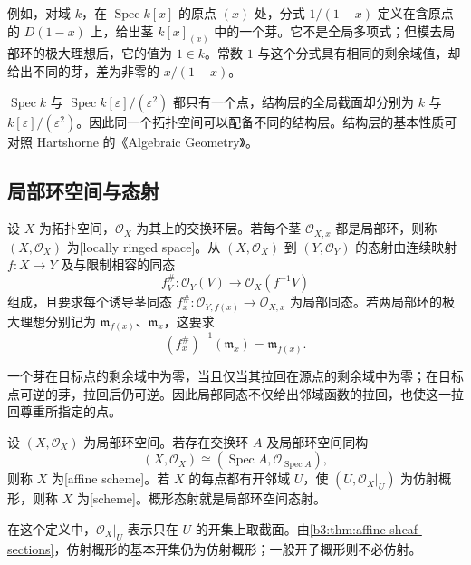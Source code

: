 例如，对域 \(k\)，在 \(\operatorname{Spec}k[x]\) 的原点 \((x)\) 处，分式 \(1/(1-x)\) 定义在含原点的 \(D(1-x)\) 上，给出茎 \(k[x]_{(x)}\) 中的一个芽。它不是全局多项式；但模去局部环的极大理想后，它的值为 \(1\in k\)。常数 \(1\) 与这个分式具有相同的剩余域值，却给出不同的芽，差为非零的 \(x/(1-x)\)。

\ProseParagraphBreak
\(\operatorname{Spec}k\) 与 \(\operatorname{Spec}k[\varepsilon]/(\varepsilon^2)\) 都只有一个点，结构层的全局截面却分别为 \(k\) 与 \(k[\varepsilon]/(\varepsilon^2)\)。因此同一个拓扑空间可以配备不同的结构层。结构层的基本性质可对照 Hartshorne 的《Algebraic Geometry》\cite[Chapter II, Proposition 2.2, pp. 71--72]{Hartshorne1977}。

\subsection{局部环空间与态射}
\label{b3:subsec:2401:03}

\begin{definition}\label{b3:def:locally-ringed-space}
	设 \(X\) 为拓扑空间，\(\mathcal O_X\) 为其上的交换环层。若每个茎 \(\mathcal O_{X,x}\) 都是局部环，则称 \((X,\mathcal O_X)\) 为[locally ringed space]。从 \((X,\mathcal O_X)\) 到 \((Y,\mathcal O_Y)\) 的态射由连续映射 \(f:X\rightarrow Y\) 及与限制相容的同态
	\[
		f^\#_V:\mathcal O_Y(V)\longrightarrow\mathcal O_X(f^{-1}V)
	\]
	组成，且要求每个诱导茎同态 \(f_x^\#:\mathcal O_{Y,f(x)}\rightarrow\mathcal O_{X,x}\) 为局部同态。若两局部环的极大理想分别记为 \(\mathfrak m_{f(x)}\)、\(\mathfrak m_x\)，这要求
	\[
		(f_x^\#)^{-1}(\mathfrak m_x)=\mathfrak m_{f(x)}.
	\]
\end{definition}

一个芽在目标点的剩余域中为零，当且仅当其拉回在源点的剩余域中为零；在目标点可逆的芽，拉回后仍可逆。因此局部同态不仅给出邻域函数的拉回，也使这一拉回尊重所指定的点。

\begin{definition}\label{b3:def:scheme}
	设 \((X,\mathcal O_X)\) 为局部环空间。若存在交换环 \(A\) 及局部环空间同构
	\[
		(X,\mathcal O_X)\cong(\operatorname{Spec}A,\mathcal O_{\operatorname{Spec}A}),
	\]
	则称 \(X\) 为[affine scheme]。若 \(X\) 的每点都有开邻域 \(U\)，使 \((U,\mathcal O_X|_U)\) 为仿射概形，则称 \(X\) 为[scheme]。概形态射就是局部环空间态射。
\end{definition}

在这个定义中，\(\mathcal O_X|_U\) 表示只在 \(U\) 的开集上取截面。由\cref{b3:thm:affine-sheaf-sections}，仿射概形的基本开集仍为仿射概形；一般开子概形则不必仿射。

